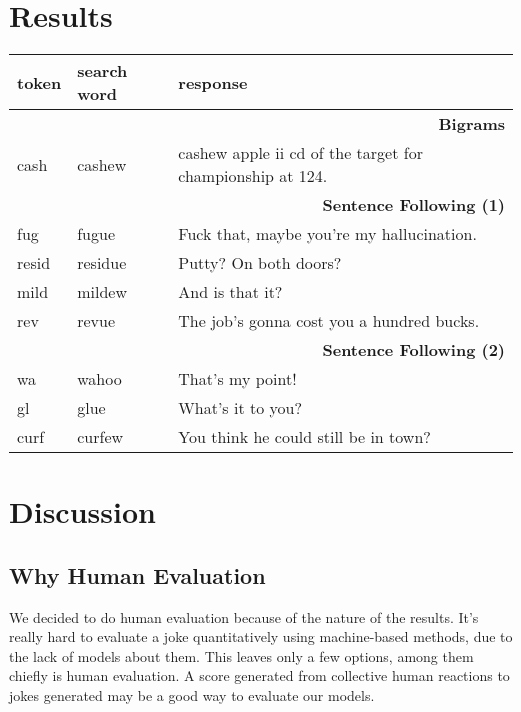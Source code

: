 \documentclass[twoside,twocolumn]{article}
\begin{document}
\section{Results}


\begin{center}
\begin{tabular}{lp{10mm}p{30mm}}
\toprule
token & search word & response\\
\midrule
\multicolumn{3}{r}{\textbf{Bigrams}} \\
\cmidrule(r){1-3}
cash & cashew & cashew apple ii cd of the target for championship at 124. \\
\midrule
\multicolumn{3}{r}{\textbf{Sentence Following (1)}} \\
\cmidrule(r){1-3}
fug & fugue & Fuck that, maybe you're my hallucination. \\
resid & residue & Putty? On both doors? \\
mild & mildew & And is that it? \\
rev & revue & The job's gonna cost you a hundred bucks. \\
\midrule
\multicolumn{3}{r}{\textbf{Sentence Following (2)}} \\
\cmidrule(r){1-3}
wa & wahoo & That's my point! \\
gl & glue & What's it to you? \\
curf & curfew & You think he could still be in town? \\
\bottomrule
\end{tabular}
\end{center}


\section{Discussion}

\subsection{Why Human Evaluation}

We decided to do human evaluation because of the nature of the results. It's really hard to evaluate a joke quantitatively using machine-based methods, due to the lack of models about them. This leaves only a few options, among them chiefly is human evaluation. A score generated from collective human reactions to jokes generated may be a good way to evaluate our models.
\end{document}
